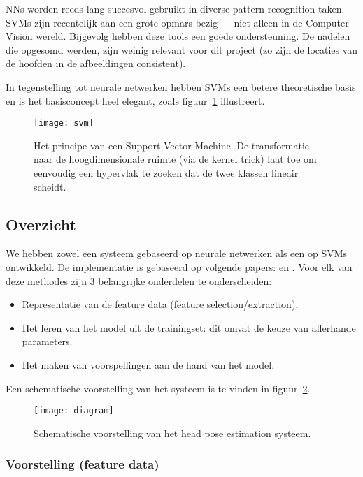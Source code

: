 \documentclass[a4paper,dutch,11pt]{scrartcl}
\begin{document}
NNs worden reeds lang succesvol gebruikt in diverse pattern recognition taken. SVMs zijn recentelijk aan een grote opmars bezig --- niet alleen in de Computer Vision wereld. Bijgevolg hebben deze tools een goede ondersteuning. De nadelen die opgesomd werden, zijn weinig relevant voor dit project (zo zijn de locaties van de hoofden in de afbeeldingen consistent).

In tegenstelling tot neurale netwerken hebben SVMs een betere theoretische basis \cite{theoretical} en is het basisconcept heel elegant, zoals figuur~\ref{fig:svm} illustreert.

\begin{figure}[hbpt]\centering
 \texttt{[image: svm]}
\caption{Het principe van een Support Vector Machine. De transformatie naar de hoogdimensionale ruimte (via de kernel trick) laat toe om eenvoudig een hypervlak te zoeken dat de twee klassen lineair scheidt. \cite{svmwikipedia}}
\label{fig:svm}
\end{figure}

\subsection{Overzicht}
We hebben zowel een systeem gebaseerd op neurale netwerken als een op SVMs ontwikkeld. De implementatie is gebaseerd op volgende papers: \cite{neural} en \cite{svmli}.
Voor elk van deze methodes zijn 3 belangrijke onderdelen te onderscheiden: 
\begin{itemize}
 \item Representatie van de feature data (feature selection/extraction).
 \item Het leren van het model uit de trainingset: dit omvat de keuze van allerhande parameters.
 \item Het maken van voorspellingen aan de hand van het model.
\end{itemize}
Een schematische voorstelling van het systeem is te vinden in figuur~\ref{fig:diagram}.

\begin{figure}[hbpt]
\texttt{[image: diagram]}
\caption{Schematische voorstelling van het head pose estimation systeem.}
\label{fig:diagram}
\end{figure}

\subsubsection{Voorstelling (feature data)}
\end{document}
